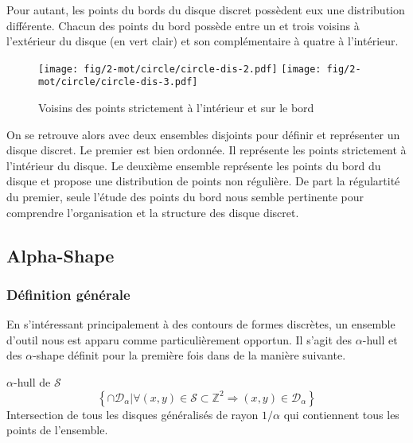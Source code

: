 Pour autant, les points du bords du disque discret possèdent eux une distribution différente. Chacun des points du bord possède entre un et trois voisins à l'extérieur du disque (en vert clair) et son complémentaire à quatre à l'intérieur.\\

\begin{figure}[H]
  \centering
  \texttt{[image: fig/2-mot/circle/circle-dis-2.pdf]}
  \texttt{[image: fig/2-mot/circle/circle-dis-3.pdf]}
  \caption{Voisins des points strictement à l'intérieur et sur le bord }
\end{figure}

On se retrouve alors avec deux ensembles disjoints pour définir et représenter un disque discret. Le premier est bien ordonnée. Il représente les points strictement à l'intérieur du disque. Le deuxième ensemble représente les points du bord du disque et propose une distribution de points non régulière. De part la régulartité du premier, seule l'étude des points du bord nous semble pertinente pour comprendre l'organisation et la structure des disque discret.


\subsection{Alpha-Shape}

\subsubsection{Définition générale}

En s'intéressant principalement à des contours de formes discrètes, un ensemble d'outil nous est apparu comme particulièrement opportun. Il s'agit des $\alpha$-hull et des $\alpha$-shape définit pour la première fois dans \cite{EdeKirSei83} de la manière suivante.

\begin{Definition}{$\alpha$-hull de $\mathcal{S}$}
\label{def:ah}
    $$\left\{ \cap \mathcal{D}_{\alpha} | \forall (x,y)\in \mathcal{S} \subset \mathbb{Z}^{2} \Rightarrow (x,y) \in \mathcal{D}_{\alpha} \right\}$$
    Intersection de tous les disques généralisés de rayon $1/\alpha$ qui contiennent tous les points de l'ensemble.
\end{Definition}

